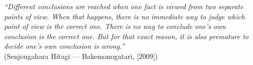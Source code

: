 \begin{epigrafe}
    \vspace*{\fill}
{%
    \noindent\hspace{.5\textwidth}
    {\begin{minipage}{.5\textwidth}
        \textit{``Different conclusions are reached when one fact is viewed from two separate points of view. When that happens, there is no immediate way to judge which point of view is the correct one. There is no way to conclude one’s own conclusion is the correct one. But for that exact reason, it is also premature to decide one’s own conclusion is wrong.''}\\(Senjougahara Hitagi {---} Bakemonogatari, [2009])
    \end{minipage}}%
    \vspace*{3cm}
}%
\end{epigrafe}
